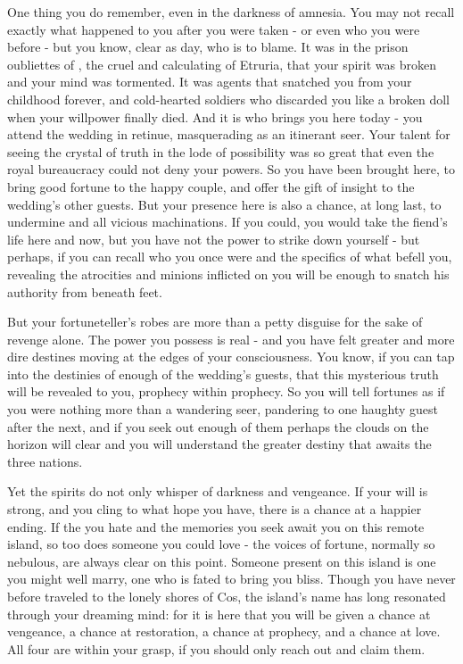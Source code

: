 \documentclass[char]{Kos}
\begin{document}
One thing you do remember, even in the darkness of amnesia. You may not recall exactly what happened to you after you were taken - or even who you were before - but you know, clear as day, who is to blame. It was in the prison oubliettes of \cEtruriaKing{}, the cruel and calculating \cEtruriaKing{\monarch} of Etruria, that your spirit was broken and your mind was tormented. It was \cEtruriaKing{\their} agents that snatched you from your childhood forever, and \cEtruriaKing{\their} cold-hearted soldiers who discarded you like a broken doll when your willpower finally died. And it is \cEtruriaKing{} who brings you here today - you attend the wedding in \cEtruriaKing{\their} retinue, masquerading as an itinerant seer. Your talent for seeing the crystal of truth in the lode of possibility was so great that even the royal bureaucracy could not deny your powers. So you have been brought here, to bring good fortune to the happy couple, and offer the gift of insight to the wedding's other guests. But your presence here is also a chance, at long last, to undermine \cEtruriaKing{\Monarch} \cEtruriaKing{} and all \cEtruriaKing{\their} vicious machinations. If you could, you would take the fiend's life here and now, but you have not the power to strike \cEtruriaKing{\them} down yourself - but perhaps, if you can recall who you once were and the specifics of what befell you, revealing the atrocities \cEtruriaKing{} and \cEtruriaKing{\their} minions inflicted on you will be enough to snatch his authority from beneath \cEtruriaKing{\their} feet.

But your fortuneteller's robes are more than a petty disguise for the sake of revenge alone. The power you possess is real - and you have felt greater and more dire destines moving at the edges of your consciousness. You know, if you can tap into the destinies of enough of the wedding's guests, that this mysterious truth will be revealed to you, prophecy within prophecy. So you will tell fortunes as if you were nothing more than a wandering seer, pandering to one haughty guest after the next, and if you seek out enough of them perhaps the clouds on the horizon will clear and you will understand the greater destiny that awaits the three nations.

Yet the spirits do not only whisper of darkness and vengeance. If your will is strong, and you cling to what hope you have, there is a chance at a happier ending. If the \cEtruriaKing{\human} you hate and the memories you seek await you on this remote island, so too does someone you could love - the voices of fortune, normally so nebulous, are always clear on this point. Someone present on this island is one you might well marry, one who is fated to bring you bliss. Though you have never before traveled to the lonely shores of Cos, the island's name has long resonated through your dreaming mind: for it is here that you will be given a chance at vengeance, a chance at restoration, a chance at prophecy, and a chance at love. All four are within your grasp, if you should only reach out and claim them. 
\end{document}
